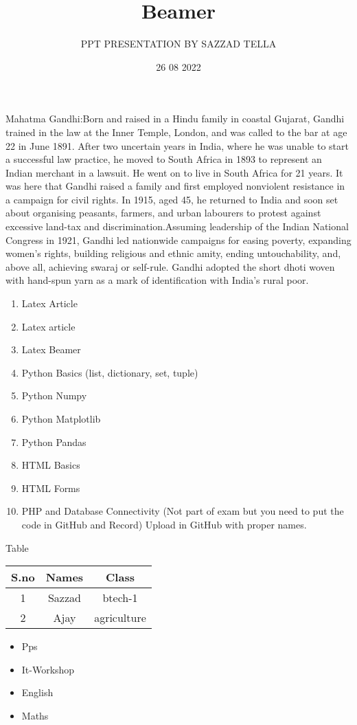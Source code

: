 \documentclass{beamer}
\title{Beamer}
\author{ PPT PRESENTATION BY SAZZAD TELLA}
\date{26 08 2022}
\begin{document}
\maketitle
\begin{frame}Mahatma Gandhi:Born and raised in a Hindu family in coastal Gujarat, Gandhi trained in the law at the Inner Temple, London, and was called to the bar at age 22 in June 1891. After two uncertain years in India, where he was unable to start a successful law practice, he moved to South Africa in 1893 to represent an Indian merchant in a lawsuit. He went on to live in South Africa for 21 years. It was here that Gandhi raised a family and first employed nonviolent resistance in a campaign for civil rights. In 1915, aged 45, he returned to India and soon set about organising peasants, farmers, and urban labourers to protest against excessive land-tax and discrimination.Assuming leadership of the Indian National Congress in 1921, Gandhi led nationwide campaigns for easing poverty, expanding women's rights, building religious and ethnic amity, ending untouchability, and, above all, achieving swaraj or self-rule. Gandhi adopted the short dhoti woven with hand-spun yarn as a mark of identification with India's rural poor. 

\end{frame}
\begin{frame}
\begin{enumerate}
\item Latex Article
\item Latex article
\item Latex Beamer 
\item Python Basics (list, dictionary, set, tuple)
\item Python Numpy
\item Python Matplotlib
\item Python Pandas
\item HTML Basics
\item HTML Forms
\item PHP and Database Connectivity (Not part of exam but you need to put the code in GitHub and Record)
Upload in GitHub with proper names.
\end{enumerate}
\end{frame}
\begin{frame}{Table}
   \begin{tabular}{|c|c|c|}
 \hline
S.no & Names & Class\\
\hline
1 & Sazzad & btech-1 \\
\hline
2 & Ajay & agriculture\\
\hline
   \end{tabular} 
\end{frame}
\begin{itemize}
    \item Pps
    \item It-Workshop
    \item English
    \item Maths
\end{itemize}
\end{document}
